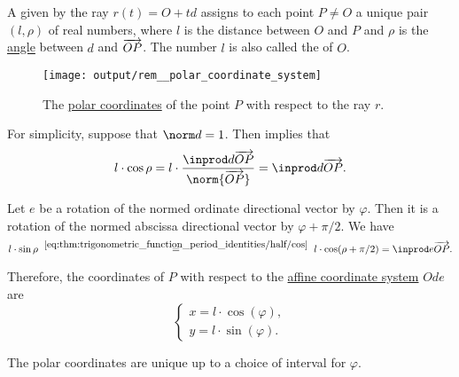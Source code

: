 \begin{concept}\label{con:polar_coordinate_system}
  A  given by the ray \( r(t) = O + td \) assigns to each point \( P \neq O \) a unique pair \( (l, \rho) \) of real numbers, where \( l \) is the distance between \( O \) and \( P \) and \( \rho \) is the \hyperref[def:angle]{angle} between \( d \) and \( \overrightarrow{OP} \). The number \( l \) is also called the  of \( O \).

  \begin{figure}[!ht]
    \centering
    \texttt{[image: output/rem\_\_polar\_coordinate\_system]}
    \caption{The \hyperref[con:polar_coordinate_system]{polar coordinates} of the point \( P \) with respect to the ray \( r \).}\label{fig:con:polar_coordinate_system}
  \end{figure}

  For simplicity, suppose that \( \norm d = 1 \). Then  implies that
  \begin{equation*}
    l \cdot \cos \rho = l \cdot \frac {\inprod d {\vect{OP}}} {\norm{\vect{OP}}} = \inprod d {\vect{OP}}.
  \end{equation*}

  Let \( e \) be a rotation of the normed ordinate directional vector by \( \varphi \). Then it is a rotation of the normed abscissa directional vector by \( \varphi + \pi / 2 \). We have
  \begin{equation*}
    l \cdot \sin \rho
    \reloset {\eqref{eq:thm:trigonometric_function_period_identities/half/cos}} =
    l \cdot \cos(\rho + \pi / 2)
    =
    \inprod e {\vect{OP}}.
  \end{equation*}

  Therefore, the coordinates of \( P \) with respect to the \hyperref[def:affine_coordinate_system]{affine coordinate system} \( Ode \) are
  \begin{equation}\label{eq:con:polar_coordinate_system/simple}
    \begin{cases}
      x = l \cdot \cos(\varphi), \\
      y = l \cdot \sin(\varphi).
    \end{cases}
  \end{equation}

  The polar coordinates are unique up to a choice of interval for \( \varphi \).
\end{concept}

